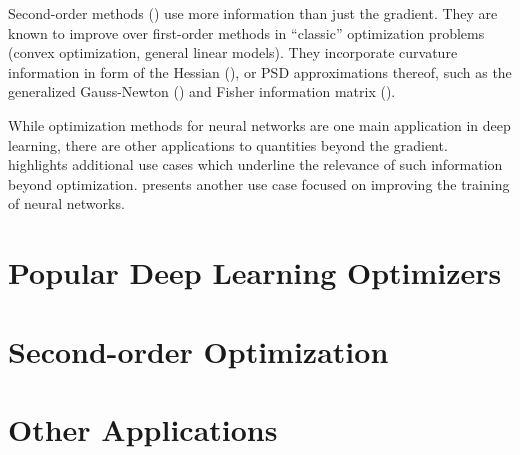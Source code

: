 Second-order methods () use more
information than just the gradient. They are known to improve over first-order
methods in ``classic'' optimization problems (convex optimization, general
linear models). They incorporate curvature information in form of the Hessian
(), or PSD approximations thereof,
such as the generalized Gauss-Newton () and Fisher
information matrix ().

While optimization methods for neural networks are one main application in deep
learning, there are other applications to quantities beyond the gradient.
 highlights additional use cases which
underline the relevance of such information beyond optimization.
 presents another use case focused on improving the
training of neural networks.

\section{Popular Deep Learning
  Optimizers}\label{sec:background::PopularOptimizers}


\section{Second-order
  Optimization}\label{sec:background::SecondOrderOptimization}


\section{Other Applications}\label{sec:background:moreApplications}


